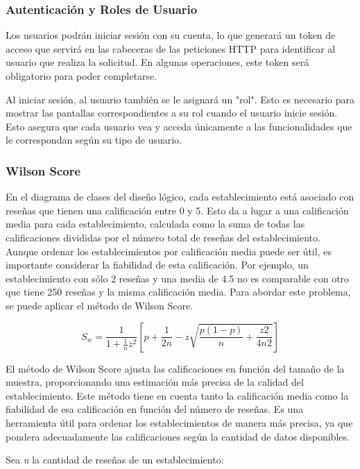 \subsubsection{Autenticación y Roles de Usuario}

Los usuarios podrán iniciar sesión con su cuenta, lo que generará un token de acceso que servirá en las cabeceras de las peticiones HTTP para identificar al usuario que realiza la solicitud. En algunas operaciones, este token será obligatorio para poder completarse.

Al iniciar sesión, al usuario también se le asignará un "rol". Esto es necesario para mostrar las pantallas correspondientes a su rol cuando el usuario inicie sesión. Esto asegura que cada usuario vea y acceda únicamente a las funcionalidades que le correspondan según su tipo de usuario.

\subsubsection{Wilson Score}

En el diagrama de clases del diseño lógico, cada establecimiento está asociado con reseñas que tienen una calificación entre 0 y 5. Esto da a lugar a una calificación media para cada establecimiento, calculada como la suma de todas las calificaciones divididas por el número total de reseñas del establecimiento. Aunque ordenar los establecimientos por calificación media puede ser útil, es importante considerar la fiabilidad de esta calificación. Por ejemplo, un establecimiento con sólo 2 reseñas y una media de 4.5 no es comparable con otro que tiene 250 reseñas y la misma calificación media. Para abordar este problema, se puede aplicar el método de Wilson Score.\cite{talton}

\[ S_w = \frac{1}{{1 + \frac{1}{n} z^2}} \left[ p + \frac{1}{2n} - z\sqrt{\frac{p(1-p)}{n} + \frac{z2}{4n2}} \right] \]

El método de Wilson Score ajusta las calificaciones en función del tamaño de la muestra, proporcionando una estimación más precisa de la calidad del establecimiento. Este método tiene en cuenta tanto la calificación media como la fiabilidad de esa calificación en función del número de reseñas. Es una herramienta útil para ordenar los establecimientos de manera más precisa,  ya que pondera adecuadamente las calificaciones según la cantidad de datos disponibles.

Sea \textit{n} la cantidad de reseñas de un establecimiento:

